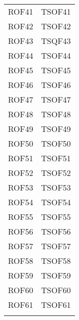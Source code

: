 \documentclass[../PianoDiQualifica_v3.0.0.tex]{subfiles}
\begin{document}
\begin{longtable}[c] { >{\centering\arraybackslash}p{3cm} >{\centering\arraybackslash}p{3cm}}
			\addlinespace[0.3em]
			\midrule
			\addlinespace[0.3em]
			ROF41 & TSOF41 \\
			\addlinespace[0.3em]
			\midrule
			\addlinespace[0.3em]
			ROF42 & TSOF42 \\
			\addlinespace[0.3em]
			\midrule
			\addlinespace[0.3em]
			ROF43 & TSQF43 \\
			\addlinespace[0.3em]
			\midrule
			\addlinespace[0.3em]
			ROF44 & TSOF44 \\
			\addlinespace[0.3em]
			\midrule
			\addlinespace[0.3em]
			ROF45 & TSOF45 \\
			\addlinespace[0.3em]
			\midrule
			\addlinespace[0.3em]
			ROF46 & TSOF46 \\
			\addlinespace[0.3em]
			\midrule
			\addlinespace[0.3em]
			ROF47 & TSOF47 \\
			\addlinespace[0.3em]
			\midrule
			\addlinespace[0.3em]
			ROF48 & TSOF48 \\
			\addlinespace[0.3em]
			\midrule
			\addlinespace[0.3em]
			ROF49 & TSOF49 \\
			\addlinespace[0.3em]
			\midrule
			\addlinespace[0.3em]
			ROF50 & TSOF50 \\
			\addlinespace[0.3em]
			\midrule
			\addlinespace[0.3em]
			ROF51 & TSOF51 \\
			\addlinespace[0.3em]
			\midrule
			\addlinespace[0.3em]
			ROF52 & TSOF52 \\
			\addlinespace[0.3em]
			\midrule
			\addlinespace[0.3em]
			ROF53 & TSOF53 \\
			\addlinespace[0.3em]
			\midrule
			\addlinespace[0.3em]
			ROF54 & TSOF54 \\
			\addlinespace[0.3em]
			\midrule
			\addlinespace[0.3em]
			ROF55 & TSOF55 \\
			\addlinespace[0.3em]
			\midrule
			\addlinespace[0.3em]
			ROF56 & TSOF56 \\
			\addlinespace[0.3em]
			\midrule
			\addlinespace[0.3em]
			ROF57 & TSOF57 \\
			\addlinespace[0.3em]
			\midrule
			\addlinespace[0.3em]
			ROF58 & TSOF58 \\
			\addlinespace[0.3em]
			\midrule
			\addlinespace[0.3em]
			ROF59 & TSOF59 \\
			\addlinespace[0.3em]
			\midrule
			\addlinespace[0.3em]
			ROF60 & TSOF60 \\
			\addlinespace[0.3em]
			\midrule
			\addlinespace[0.3em]
			ROF61 & TSOF61 \\
			\addlinespace[0.3em]
			\midrule
			\addlinespace[0.3em]

\end{longtable}
\end{document}
